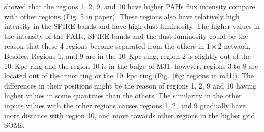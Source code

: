         \cite{Dim15} showed that the regions 1, 2, 9, and 10 have higher PAHs flux intensity compare with other regions (Fig. 5 in \cite{Dim15} paper). 
        These regions also have relatively high intensity in the SPIRE bands and have high dust luminosity.
        The higher values in the intensity of the PAHs, SPIRE bands and the dust luminosity could be the reason that these 4 regions become separated from the others in  $1\times2$ network.
        Besides, Regions 1, and 9 are in the 10~Kpc ring, region 2 is slightly out of the 10~Kpc ring and the region 10 is in the bulge of M31; however, regions 3 to 8 are located out of the inner ring or the 10~kpc ring (Fig.~\ref{fig: regions in m31}).   
        The differences in their positions might be the reason of regions 1, 2, 9 and 10 having higher values in some quantities than the others. 
        The similarity in the other inputs values with the other regions causes regions 1, 2, and 9 gradually have more distance with region 10, and move towards other regions in the higher grid SOMs.
        
        
